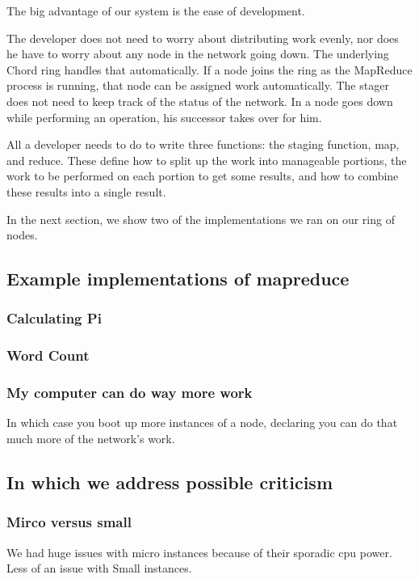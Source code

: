 \documentclass[conference, compsocconf, letterpaper]{IEEEtran}
\begin{document}
The big advantage of our system is the ease of development.  

The developer does not need to worry about distributing work evenly, nor does he have to worry about any node in the network going down.  The underlying Chord ring handles that automatically.  If a node joins the ring as the MapReduce process is running, that node can be assigned work automatically.  The stager does not need to keep track of the status of the network.  In a node goes down while performing an operation, his successor takes over for him.

All a developer needs to do to write three functions: the staging function, map, and reduce.  These define how to split up the work into manageable portions,  the  work to be performed on each portion to get some results, and how to combine these results into a single result. 

In the next section, we show two of the implementations we ran on our ring of nodes.

\subsection{Example implementations of mapreduce}

\subsubsection{Calculating Pi}

\subsubsection{Word Count}

\subsubsection{My computer can do way more work}  In which case you boot up more instances of a node, declaring you can do that much more of the network's work.


\subsection{In which we address possible criticism}


\subsubsection{Mirco versus small}
We had huge issues with micro instances because of their sporadic cpu power.  Less of an issue with Small instances.
\end{document}
